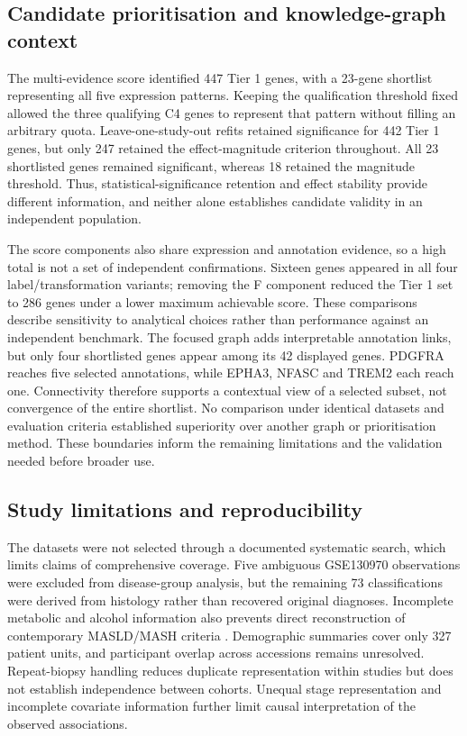 \documentclass[11pt,a4paper]{article}
\begin{document}
\subsection*{Candidate prioritisation and knowledge-graph context}
The multi-evidence score identified 447 Tier 1 genes, with a 23-gene shortlist representing all five expression patterns. Keeping the qualification threshold fixed allowed the three qualifying C4 genes to represent that pattern without filling an arbitrary quota. Leave-one-study-out refits retained significance for 442 Tier 1 genes, but only 247 retained the effect-magnitude criterion throughout. All 23 shortlisted genes remained significant, whereas 18 retained the magnitude threshold. Thus, statistical-significance retention and effect stability provide different information, and neither alone establishes candidate validity in an independent population.

The score components also share expression and annotation evidence, so a high total is not a set of independent confirmations. Sixteen genes appeared in all four label/transformation variants; removing the F component reduced the Tier 1 set to 286 genes under a lower maximum achievable score. These comparisons describe sensitivity to analytical choices rather than performance against an independent benchmark. The focused graph adds interpretable annotation links, but only four shortlisted genes appear among its 42 displayed genes. PDGFRA reaches five selected annotations, while EPHA3, NFASC and TREM2 each reach one. Connectivity therefore supports a contextual view of a selected subset, not convergence of the entire shortlist. No comparison under identical datasets and evaluation criteria established superiority over another graph or prioritisation method. These boundaries inform the remaining limitations and the validation needed before broader use.

\subsection*{Study limitations and reproducibility}
The datasets were not selected through a documented systematic search, which limits claims of comprehensive coverage. Five ambiguous GSE130970 observations were excluded from disease-group analysis, but the remaining 73 classifications were derived from histology rather than recovered original diagnoses. Incomplete metabolic and alcohol information also prevents direct reconstruction of contemporary MASLD/MASH criteria \cite{ref3}. Demographic summaries cover only 327 patient units, and participant overlap across accessions remains unresolved. Repeat-biopsy handling reduces duplicate representation within studies but does not establish independence between cohorts. Unequal stage representation and incomplete covariate information further limit causal interpretation of the observed associations.
\end{document}
